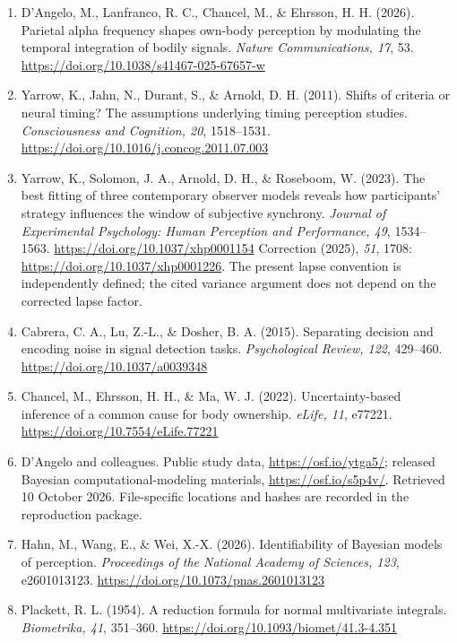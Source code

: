 \documentclass[
  11pt,
]{article}
\begin{document}
\begin{enumerate}
\def\labelenumi{\arabic{enumi}.}
\item
  D'Angelo, M., Lanfranco, R. C., Chancel, M., \& Ehrsson, H. H. (2026).
  Parietal alpha frequency shapes own-body perception by modulating the
  temporal integration of bodily signals. \emph{Nature Communications,
  17}, 53. \url{https://doi.org/10.1038/s41467-025-67657-w}
\item
  Yarrow, K., Jahn, N., Durant, S., \& Arnold, D. H. (2011). Shifts of
  criteria or neural timing? The assumptions underlying timing
  perception studies. \emph{Consciousness and Cognition, 20},
  1518--1531. \url{https://doi.org/10.1016/j.concog.2011.07.003}
\item
  Yarrow, K., Solomon, J. A., Arnold, D. H., \& Roseboom, W. (2023). The
  best fitting of three contemporary observer models reveals how
  participants' strategy influences the window of subjective synchrony.
  \emph{Journal of Experimental Psychology: Human Perception and
  Performance, 49}, 1534--1563. \url{https://doi.org/10.1037/xhp0001154}
  Correction (2025), \emph{51}, 1708:
  \url{https://doi.org/10.1037/xhp0001226}. The present lapse convention
  is independently defined; the cited variance argument does not depend
  on the corrected lapse factor.
\item
  Cabrera, C. A., Lu, Z.-L., \& Dosher, B. A. (2015). Separating
  decision and encoding noise in signal detection tasks.
  \emph{Psychological Review, 122}, 429--460.
  \url{https://doi.org/10.1037/a0039348}
\item
  Chancel, M., Ehrsson, H. H., \& Ma, W. J. (2022). Uncertainty-based
  inference of a common cause for body ownership. \emph{eLife, 11},
  e77221. \url{https://doi.org/10.7554/eLife.77221}
\item
  D'Angelo and colleagues. Public study data,
  \url{https://osf.io/ytga5/}; released Bayesian computational-modeling
  materials, \url{https://osf.io/s5p4v/}. Retrieved 10 October 2026.
  File-specific locations and hashes are recorded in the reproduction
  package.
\item
  Hahn, M., Wang, E., \& Wei, X.-X. (2026). Identifiability of Bayesian
  models of perception. \emph{Proceedings of the National Academy of
  Sciences, 123}, e2601013123.
  \url{https://doi.org/10.1073/pnas.2601013123}
\item
  Plackett, R. L. (1954). A reduction formula for normal multivariate
  integrals. \emph{Biometrika, 41}, 351--360.
  \url{https://doi.org/10.1093/biomet/41.3-4.351}

\end{enumerate}
\end{document}

